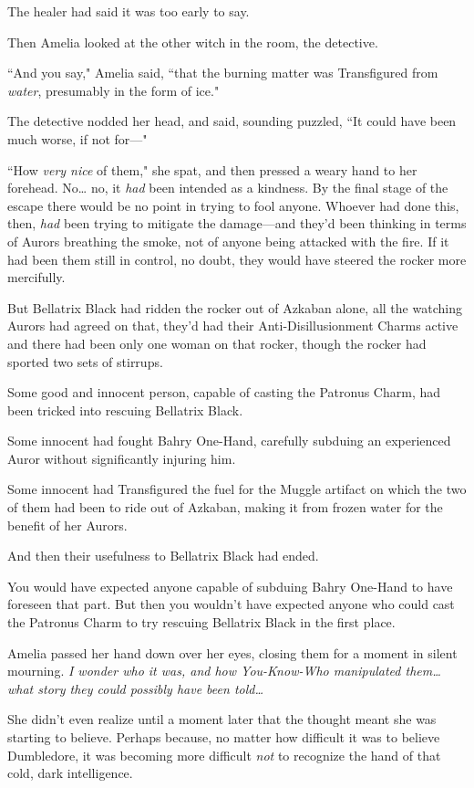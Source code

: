 The healer had said it was too early to say.

Then Amelia looked at the other witch in the room, the detective.

``And you say," Amelia said, ``that the burning matter was Transfigured from \emph{water}, presumably in the form of ice."

The detective nodded her head, and said, sounding puzzled, ``It could have been much worse, if not for—"

``How \emph{very nice} of them," she spat, and then pressed a weary hand to her forehead. No{\ldots} no, it \emph{had} been intended as a kindness. By the final stage of the escape there would be no point in trying to fool anyone. Whoever had done this, then, \emph{had} been trying to mitigate the damage—and they'd been thinking in terms of Aurors breathing the smoke, not of anyone being attacked with the fire. If it had been them still in control, no doubt, they would have steered the rocker more mercifully.

But Bellatrix Black had ridden the rocker out of Azkaban alone, all the watching Aurors had agreed on that, they'd had their Anti-Disillusionment Charms active and there had been only one woman on that rocker, though the rocker had sported two sets of stirrups.

Some good and innocent person, capable of casting the Patronus Charm, had been tricked into rescuing Bellatrix Black.

Some innocent had fought Bahry One-Hand, carefully subduing an experienced Auror without significantly injuring him.

Some innocent had Transfigured the fuel for the Muggle artifact on which the two of them had been to ride out of Azkaban, making it from frozen water for the benefit of her Aurors.

And then their usefulness to Bellatrix Black had ended.

You would have expected anyone capable of subduing Bahry One-Hand to have foreseen that part. But then you wouldn't have expected anyone who could cast the Patronus Charm to try rescuing Bellatrix Black in the first place.

Amelia passed her hand down over her eyes, closing them for a moment in silent mourning. \emph{I wonder who it was, and how You-Know-Who manipulated them{\ldots} what story they could \emph{possibly} have been told{\ldots}}

She didn't even realize until a moment later that the thought meant she was starting to believe. Perhaps because, no matter how difficult it was to believe Dumbledore, it was becoming more difficult \emph{not} to recognize the hand of that cold, dark intelligence.

